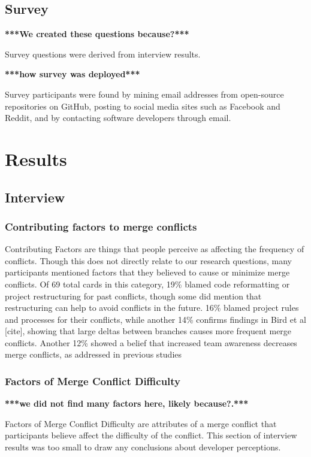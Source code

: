 \subsection{Survey}

\textbf{***We created these questions because?***}

Survey questions were derived from interview results. 

\textbf{***how survey was deployed***}

Survey participants were found by mining email addresses from open-source repositories on GitHub, posting to social media sites such as Facebook and Reddit, and by contacting software developers through email.

\section{Results}
\subsection{Interview}
\subsubsection{Contributing factors to merge conflicts}

Contributing Factors are things that people perceive as affecting the frequency of conflicts. Though this does not directly relate to our research questions, many participants mentioned factors that they believed to cause or minimize merge conflicts. Of 69 total cards in this category, 19\% blamed code reformatting or project restructuring for past conflicts, though some did mention that restructuring can help to avoid conflicts in the future. 16\% blamed project rules and processes for their conflicts, while another 14\% confirms findings in Bird et al [cite], showing that large deltas between branches causes more frequent merge conflicts. Another 12\% showed a belief that increased team awareness decreases merge conflicts, as addressed in previous studies \cite{Brun2011} \cite{palantir} 

\subsubsection{Factors of Merge Conflict Difficulty}

\textbf{***we did not find many factors here, likely because?.***}

Factors of Merge Conflict Difficulty are attributes of a merge conflict that participants believe affect the difficulty of the conflict. This section of interview results was too small to draw any conclusions about developer perceptions.

